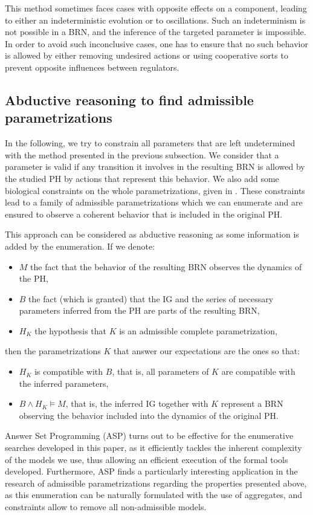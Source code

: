 This method sometimes faces cases with opposite effects on a component, leading to either an indeterministic evolution or to oscillations.
Such an indeterminism is not possible in a BRN, and the inference of the targeted parameter is impossible.
In order to avoid such inconclusive cases, one has to ensure that no such behavior is allowed
by either removing undesired actions or using cooperative sorts to prevent opposite influences between regulators.

\subsection{Abductive reasoning to find admissible parametrizations}\label{ssec:admissible-K}

In the following, we try to constrain all parameters that are left undetermined with the method presented in the previous subsection.
We consider that a parameter is valid if any transition it involves in the resulting BRN is allowed by the studied PH by actions that represent this behavior.
We also add some biological constraints on the whole parametrizations, given in \cite{BernotSemBRN}.
These constraints lead to a family of admissible parametrizations which we can enumerate and are ensured to observe a coherent behavior that is included in the original PH.

This approach can be considered as abductive reasoning as some information is added by the enumeration.
If we denote:
\begin{itemize}
  \item $M$ the fact that the behavior of the resulting BRN observes the dynamics of the PH,
  \item $B$ the fact (which is granted) that the IG and the series of necessary parameters inferred from the PH are parts of the resulting BRN,
  \item $H_K$ the hypothesis that $K$ is an admissible complete parametrization,
\end{itemize}
then the parametrizations $K$ that answer our expectations are the ones so that:
\begin{itemize}
  \item $H_K$ is compatible with $B$, that is, all parameters of $K$ are compatible with the inferred parameters,
  \item $B \wedge H_K \models M$, that is, the inferred IG together with $K$ represent a BRN observing the behavior included into the dynamics of the original PH.
\end{itemize}

Answer Set Programming (ASP) \cite{Baral03} turns out to be effective for the enumerative searches developed in this paper,
as it efficiently tackles the inherent complexity of the models we use, thus allowing an efficient execution of the formal tools developed.
Furthermore, ASP finds a particularly interesting application in the research of admissible parametrizations regarding the properties presented above, as this enumeration can be naturally formulated with the use of aggregates, and constraints allow to remove all non-admissible models.
